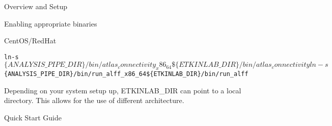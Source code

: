 \documentclass[]{report}
\begin{document}
\begin{chapter}{Overview and Setup}
\begin{section}{Enabling appropriate binaries}
\begin{subsubsection}{CentOS/RedHat}
\begin{alltt}
	ln -s $\{ANALYSIS\_PIPE\_DIR\}/bin/atlas_connectivity_x86_64 \$\{ETKINLAB\_DIR\}/bin/atlas_connectivity
	ln -s $\{ANALYSIS\_PIPE\_DIR\}/bin/run_alff_x86_64 \$\{ETKINLAB\_DIR\}/bin/run_alff
\end{alltt}

\end{subsubsection}

Depending on your system setup up, ETKINLAB\_DIR can point to a local directory. This allows for the use of different architecture.


\end{section}


\end{chapter}
\begin{chapter}{Quick Start Guide }


\end{chapter}
\end{document}
